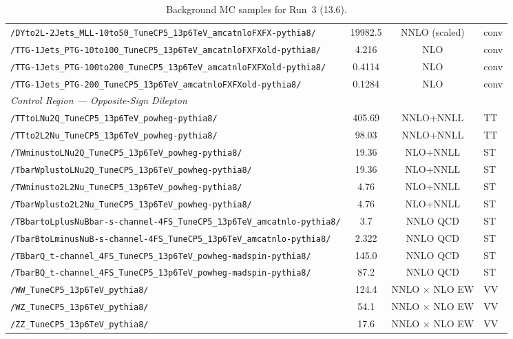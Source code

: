 \begin{table}
\begin{tabular}{lccl}
  \texttt{/DYto2L-2Jets\_MLL-10to50\_TuneCP5\_13p6TeV\_amcatnloFXFX-pythia8/} & 19982.5 & NNLO (scaled) & conv \\
  \texttt{/TTG-1Jets\_PTG-10to100\_TuneCP5\_13p6TeV\_amcatnloFXFXold-pythia8/} & 4.216 & NLO & conv \\
  \texttt{/TTG-1Jets\_PTG-100to200\_TuneCP5\_13p6TeV\_amcatnloFXFXold-pythia8/} & 0.4114 & NLO & conv \\
  \texttt{/TTG-1Jets\_PTG-200\_TuneCP5\_13p6TeV\_amcatnloFXFXold-pythia8/} & 0.1284 & NLO & conv \\
  \hline
  \multicolumn{4}{l}{\textit{Control Region — Opposite-Sign Dilepton}} \\
  \texttt{/TTtoLNu2Q\_TuneCP5\_13p6TeV\_powheg-pythia8/} & 405.69 & NNLO+NNLL & TT \\
  \texttt{/TTto2L2Nu\_TuneCP5\_13p6TeV\_powheg-pythia8/} & 98.03 & NNLO+NNLL & TT \\
  \texttt{/TWminustoLNu2Q\_TuneCP5\_13p6TeV\_powheg-pythia8/} & 19.36 & NLO+NNLL & ST \\
  \texttt{/TbarWplustoLNu2Q\_TuneCP5\_13p6TeV\_powheg-pythia8/} & 19.36 & NLO+NNLL & ST \\
  \texttt{/TWminusto2L2Nu\_TuneCP5\_13p6TeV\_powheg-pythia8/} & 4.76 & NLO+NNLL & ST \\
  \texttt{/TbarWplusto2L2Nu\_TuneCP5\_13p6TeV\_powheg-pythia8/} & 4.76 & NLO+NNLL & ST \\
  \texttt{/TBbartoLplusNuBbar-s-channel-4FS\_TuneCP5\_13p6TeV\_amcatnlo-pythia8/} & 3.7 & NNLO QCD & ST \\
  \texttt{/TbarBtoLminusNuB-s-channel-4FS\_TuneCP5\_13p6TeV\_amcatnlo-pythia8/} & 2.322 & NNLO QCD & ST \\
  \texttt{/TBbarQ\_t-channel\_4FS\_TuneCP5\_13p6TeV\_powheg-madspin-pythia8/} & 145.0 & NNLO QCD & ST \\
  \texttt{/TbarBQ\_t-channel\_4FS\_TuneCP5\_13p6TeV\_powheg-madspin-pythia8/} & 87.2 & NNLO QCD & ST \\
  \texttt{/WW\_TuneCP5\_13p6TeV\_pythia8/} & 124.4 & NNLO $\times$ NLO EW & VV \\
  \texttt{/WZ\_TuneCP5\_13p6TeV\_pythia8/} & 54.1 & NNLO $\times$ NLO EW & VV \\
  \texttt{/ZZ\_TuneCP5\_13p6TeV\_pythia8/} & 17.6 & NNLO $\times$ NLO EW & VV \\
  \hline\hline
  \end{tabular}
  \caption{Background MC samples for Run~3 (13.6\TeV).}
  \label{tab:mc_bkg_run3}
\end{table}


